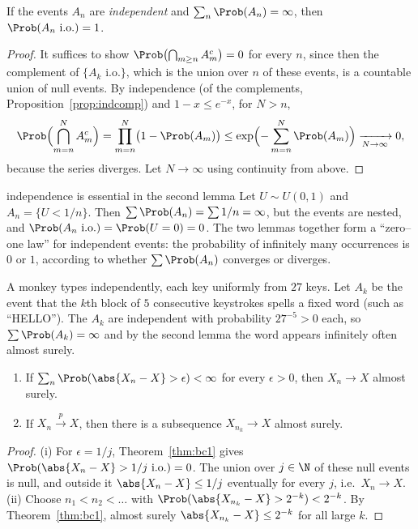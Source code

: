 \begin{theorem}\label{thm:bc2}
If the events $A_n$ are \emph{independent} and $\sum_n\Prob(A_n)=\infty$, then
$\Prob(A_n\text{ i.o.})=1$.
\end{theorem}
\begin{proof}
It suffices to show $\Prob\bigl(\bigcap_{m\ge n}A_m^c\bigr)=0$ for every $n$, since
then the complement of $\{A_k\text{ i.o.}\}$, which is the union over $n$ of these
events, is a countable union of null events. By independence (of the complements,
Proposition~\ref{prop:indcomp}) and $1-x\le e^{-x}$, for $N>n$,
\[
\Prob\Bigl(\bigcap_{m=n}^NA_m^c\Bigr)=\prod_{m=n}^N\bigl(1-\Prob(A_m)\bigr)
\le\exp\Bigl(-\sum_{m=n}^N\Prob(A_m)\Bigr)\xrightarrow[N\to\infty]{}0,
\]
because the series diverges. Let $N\to\infty$ using continuity from above.
\end{proof}

\begin{nuance}{independence is essential in the second lemma}
Let $U\sim U(0,1)$ and $A_n=\{U<1/n\}$. Then $\sum\Prob(A_n)=\sum1/n=\infty$, but the
events are nested, and $\Prob(A_n\text{ i.o.})=\Prob(U=0)=0$. The two lemmas together
form a ``zero--one law'' for independent events: the probability of infinitely many
occurrences is $0$ or $1$, according to whether $\sum\Prob(A_n)$ converges or
diverges.
\end{nuance}

\begin{example}
A monkey types independently, each key uniformly from $27$ keys. Let $A_k$ be the
event that the $k$th block of $5$ consecutive keystrokes spells a fixed word (such as
``HELLO''). The $A_k$ are independent with probability $27^{-5}>0$ each, so
$\sum\Prob(A_k)=\infty$ and by the second lemma the word appears infinitely often
almost surely.
\end{example}

\begin{theorem}\label{thm:subseq}
\begin{enumerate}[label=(\roman*)]
\item If $\sum_n\Prob(\abs{X_n-X}>\epsilon)<\infty$ for every $\epsilon>0$, then
$X_n\to X$ almost surely.
\item If $X_n\xrightarrow{p}X$, then there is a subsequence $X_{n_k}\to X$ almost
surely.
\end{enumerate}
\end{theorem}
\begin{proof}
(i) For $\epsilon=1/j$, Theorem~\ref{thm:bc1} gives $\Prob(\abs{X_n-X}>1/j\text{ i.o.})=0$.
The union over $j\in\N$ of these null events is null, and outside it $\abs{X_n-X}\le1/j$
eventually for every $j$, i.e.\ $X_n\to X$.
(ii) Choose $n_1<n_2<\dots$ with $\Prob(\abs{X_{n_k}-X}>2^{-k})<2^{-k}$. By
Theorem~\ref{thm:bc1}, almost surely $\abs{X_{n_k}-X}\le2^{-k}$ for all large $k$.
\end{proof}

